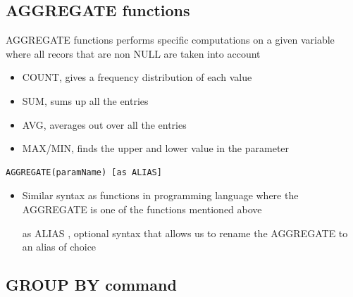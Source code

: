 \documentclass{article}
\begin{document}
\subsection{AGGREGATE functions}

AGGREGATE functions performs specific computations on a given variable where all recors that are non NULL are taken into account
\begin{itemize}
    \item COUNT, gives a frequency distribution of each value 
    \item SUM, sums up all the entries
    \item AVG, averages out over all the entries
    \item MAX/MIN, finds the upper and lower value in the parameter
\end{itemize}

\begin{lstlisting}[frame=single]
    AGGREGATE(paramName) [as ALIAS]
\end{lstlisting}
\begin{itemize}
    \item Similar syntax as functions in programming language where the AGGREGATE is one of the functions mentioned above
    \item [as ALIAS], optional syntax that allows us to rename the AGGREGATE to an alias of choice 
\end{itemize}

\subsection{GROUP BY command}
\end{document}
